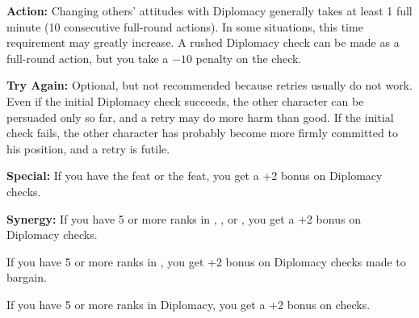 
\textbf{Action:} Changing others' attitudes with Diplomacy generally takes at least 1 full minute (10 consecutive full-round actions). In some situations, this time requirement may greatly increase. A rushed Diplomacy check can be made as a full-round action, but you take a $-10$ penalty on the check.

\textbf{Try Again:} Optional, but not recommended because retries usually do not work. Even if the initial Diplomacy check succeeds, the other character can be persuaded only so far, and a retry may do more harm than good. If the initial check fails, the other character has probably become more firmly committed to his position, and a retry is futile.

\textbf{Special:} If you have the  feat or the  feat, you get a +2 bonus on Diplomacy checks.

\textbf{Synergy:} If you have 5 or more ranks in , , or , you get a +2 bonus on Diplomacy checks.

If you have 5 or more ranks in , you get +2 bonus on Diplomacy checks made to bargain.

If you have 5 or more ranks in Diplomacy, you get a +2 bonus on  checks.